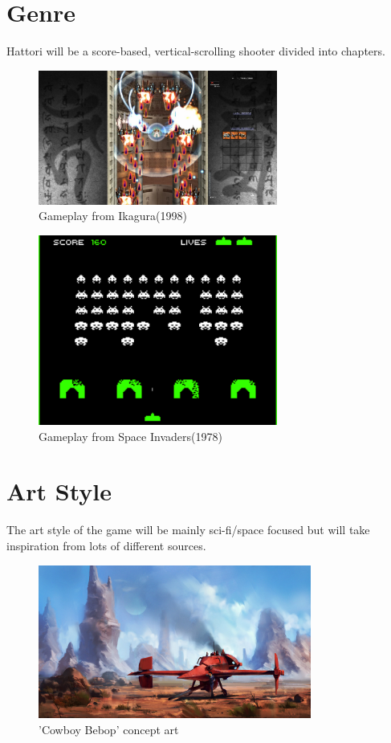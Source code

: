 \documentclass[a4paper]{scrreprt}
\begin{document}
\section{Genre}
Hattori will be a score-based, vertical-scrolling shooter divided into chapters.

\begin{figure}[h]
  \centering
  \includegraphics[width=0.7\textwidth]{IkaguraGameplay}
  \caption{\label{fig:art}Gameplay from Ikagura(1998)}
  \end{figure}

  \begin{figure}[h]
    \centering
    \includegraphics[width=0.7\textwidth]{Invaders}
    \caption{\label{fig:art}Gameplay from Space Invaders(1978)}
    \end{figure}

\clearpage

\section{Art Style}
The art style of the game will be mainly sci-fi/space focused but will take inspiration from lots of different sources. 

\begin{figure}[h]
  \centering
  \includegraphics[width=0.8\textwidth]{Spaceship}
  \caption{'Cowboy Bebop' concept art}
  \end{figure}
\end{document}
